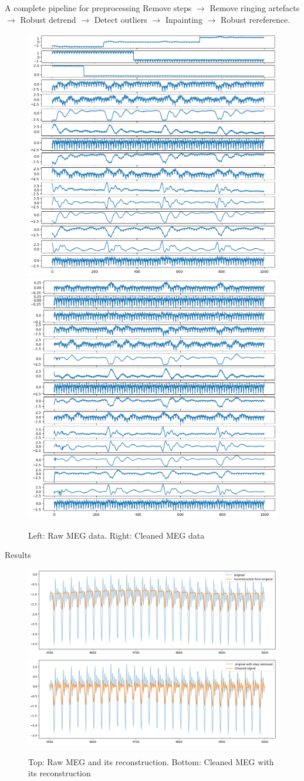 \documentclass[10pt,serif]{beamer}
\begin{document}
\begin{frame}{A complete pipeline for preprocessing}
    Remove steps \(\to\) Remove ringing artefacts \(\to\) Robust detrend \(\to\) Detect outliers \(\to\) Inpainting \(\to\) Robust rereference.
    \begin{figure}
        \centering
        \includegraphics[width=.45\textwidth]{figures/data_raw.png}
        \includegraphics[width=.45\textwidth]{figures/data_clean.png}
        \caption{Left: Raw MEG data. Right: Cleaned MEG data}
        \label{fig:data}
    \end{figure}
\end{frame}

\begin{frame}{Results}
    \begin{figure}
        \centering
        \includegraphics[width=.77\textwidth]{figures/recons}\\
        \includegraphics[width=.77\textwidth]{figures/recons_clean}
        \caption{Top: Raw MEG and its reconstruction. Bottom: Cleaned MEG with its reconstruction}
        \label{fig:recons}
    \end{figure}
\end{frame}
\end{document}
